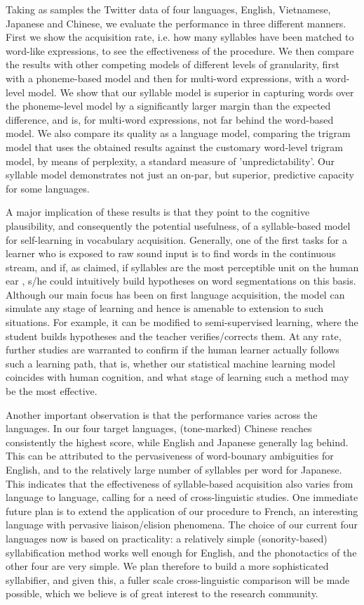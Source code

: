 \documentclass[a4,times]{article}
\begin{document}
Taking as samples the Twitter data of four languages, English, Vietnamese, Japanese and Chinese, we evaluate the performance in three different manners. First we show the acquisition rate, i.e. how many syllables have been matched to word-like expressions, to see the effectiveness of the procedure. We then compare the results with other competing models of different levels of granularity, first with a phoneme-based model and then for multi-word expressions, with a word-level model. We show that our syllable model is superior in capturing words over the phoneme-level model by a significantly larger margin than the expected difference, and is, for multi-word expressions, not far behind the word-based model. We also compare its quality as a language model, comparing the trigram model that uses the obtained results against the customary word-level trigram model, by means of perplexity, a standard measure of 'unpredictability'. Our syllable model demonstrates not just an on-par, but superior, predictive capacity for some languages. 

A major implication of these results is that they point to the cognitive plausibility, and consequently the potential usefulness, of a syllable-based model for self-learning in vocabulary acquisition. Generally, one of the first tasks for a learner who is exposed to raw sound input is to find words in the continuous stream, and if, as claimed, if syllables are the most perceptible unit on the human ear \cite{BertonciniMehler81}, s/he could intuitively build hypotheses on word segmentations on this basis. Although our main focus has been on first language acquisition, the model can simulate any stage of learning and hence is amenable to extension to such situations. For example, it can be modified to semi-supervised learning, where the student builds hypotheses and the teacher verifies/corrects them. At any rate, further studies are warranted to confirm if the human learner actually follows such a learning path, that is, whether our statistical machine learning model coincides with human cognition, and what stage of learning such a method may be the most effective.

Another important observation is that the performance varies across the languages. In our four target languages, (tone-marked) Chinese reaches consistently the highest score, while English and Japanese generally lag behind. This can be attributed to the pervasiveness of word-bounary ambiguities for English, and to the relatively large number of syllables per word for Japanese. This indicates that the effectiveness of syllable-based acquisition also varies from language to language, calling for a need of cross-linguistic studies. One immediate future plan is to extend the application of our procedure to French, an interesting language with pervasive liaison/elision phenomena. The choice of our current four languages now is based on practicality: a relatively simple (sonority-based) syllabification method works well enough for English, and the phonotactics of the other four are very simple. We plan therefore to build a more sophisticated syllabifier, and given this, a fuller scale cross-linguistic comparison will be made possible, which we believe is of great interest to the research community.



\end{document}
